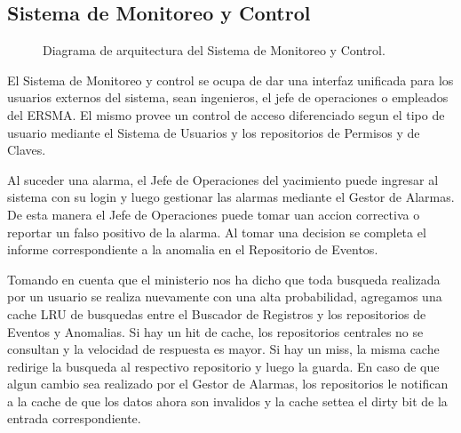 \documentclass{article}
\theoremstyle{definition}
\theoremstyle{remark}
\begin{document}
\subsection{Sistema de Monitoreo y Control} \label{monitoreo_y_control}

\begin{figure}[H]
  \caption{Diagrama de arquitectura del Sistema de Monitoreo y Control.}
\end{figure}

El Sistema de Monitoreo y control se ocupa de dar una interfaz unificada para los usuarios externos del sistema, sean ingenieros, el jefe de operaciones o empleados del ERSMA. El mismo provee un control de acceso diferenciado segun el tipo de usuario mediante el Sistema de Usuarios y los repositorios de Permisos y de Claves.

Al suceder una alarma, el Jefe de Operaciones del yacimiento puede ingresar al sistema con su login y luego gestionar las alarmas mediante el Gestor de Alarmas. De esta manera el Jefe de Operaciones puede tomar uan accion correctiva o reportar un falso positivo de la alarma. Al tomar una decision se completa el informe correspondiente a la anomalia en el Repositorio de Eventos.

Tomando en cuenta que el ministerio nos ha dicho que toda busqueda realizada por un usuario se realiza nuevamente con una alta probabilidad, agregamos una cache LRU de busquedas entre el Buscador de Registros y los repositorios de Eventos y Anomalias. Si hay un hit de cache, los repositorios centrales no se consultan y la velocidad de respuesta es mayor. Si hay un miss, la misma cache redirige la busqueda al respectivo repositorio y luego la guarda. En caso de que algun cambio sea realizado por el Gestor de Alarmas, los repositorios le notifican a la cache de que los datos ahora son invalidos y la cache settea el dirty bit de la entrada correspondiente.
\end{document}
